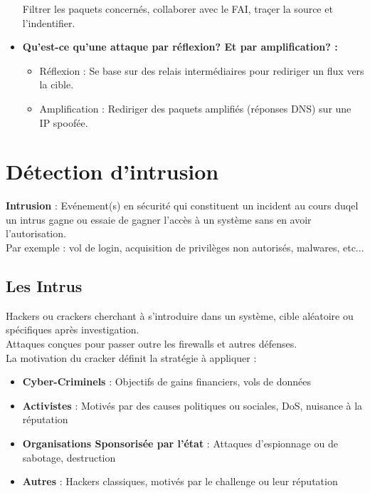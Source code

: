 \documentclass{report}
\begin{document}
\begin{itemize}
					Filtrer les paquets concernés, collaborer avec le FAI, traçer la source et l'indentifier.\\

				\item \textbf{Qu'est-ce qu'une attaque par réflexion? Et par amplification? :}\\

					\begin{itemize}
						\item Réflexion : Se base sur des relais intermédiaires pour rediriger un flux vers la cible.
						\item Amplification : Rediriger des paquets amplifiés (réponses DNS) sur une IP spoofée.
					\end{itemize}

			\end{itemize}

\chapter{Détection d'intrusion}

	\textbf{Intrusion} : Evénement(s) en sécurité qui constituent un incident au cours duqel un intrus gagne ou essaie de gagner l'accès à un système sans en avoir l'autorisation.\\

	Par exemple : vol de login, acquisition de privilèges non autorisés, malwares, etc...\\

	\section{Les Intrus}

		Hackers ou crackers cherchant à s'introduire dans un système, cible aléatoire ou spécifiques après investigation.\\
		Attaques conçues pour passer outre les firewalls et autres défenses.\\

		La motivation du cracker définit la stratégie à appliquer : \\

		\begin{itemize}
			\item \textbf{Cyber-Criminels} : Objectifs de gains financiers, vols de données
			\item \textbf{Activistes} : Motivés par des causes politiques ou sociales, DoS, nuisance à la réputation
			\item \textbf{Organisations Sponsorisée par l'état} : Attaques d'espionnage ou de sabotage, destruction
			\item \textbf{Autres} : Hackers classiques, motivés par le challenge ou leur réputation
		\end{itemize}
\end{document}
